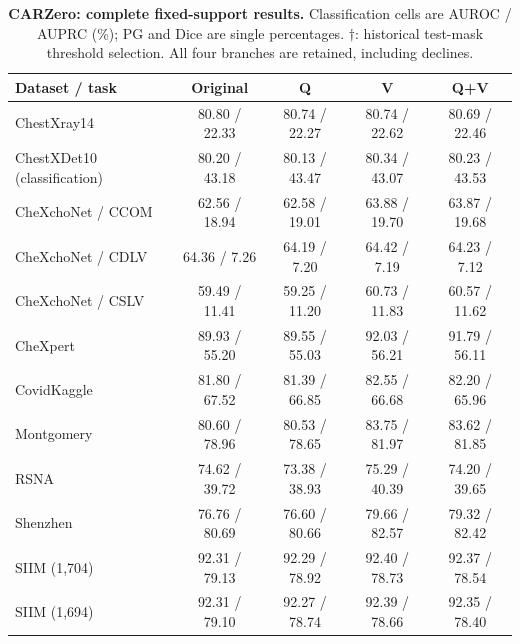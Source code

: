 \begin{table}[tp]
\centering
\caption{\textbf{CARZero: complete fixed-support results.} Classification cells are AUROC / AUPRC (\%); PG and Dice are single percentages. $\dagger$: historical test-mask threshold selection. All four branches are retained, including declines.}
\label{tab:supp-fixed-carzero}
\small
\setlength{\tabcolsep}{4pt}
\begin{tabular*}{\textwidth}{@{\extracolsep{\fill}}lcccc@{}}
\toprule
Dataset / task & Original & Q & V & Q+V \\
\midrule
ChestXray14 & 80.80 / 22.33 & 80.74 / 22.27 & 80.74 / 22.62 & 80.69 / 22.46 \\
ChestXDet10 (classification) & 80.20 / 43.18 & 80.13 / 43.47 & 80.34 / 43.07 & 80.23 / 43.53 \\
CheXchoNet / CCOM & 62.56 / 18.94 & 62.58 / 19.01 & 63.88 / 19.70 & 63.87 / 19.68 \\
CheXchoNet / CDLV & 64.36 / 7.26 & 64.19 / 7.20 & 64.42 / 7.19 & 64.23 / 7.12 \\
CheXchoNet / CSLV & 59.49 / 11.41 & 59.25 / 11.20 & 60.73 / 11.83 & 60.57 / 11.62 \\
CheXpert & 89.93 / 55.20 & 89.55 / 55.03 & 92.03 / 56.21 & 91.79 / 56.11 \\
CovidKaggle & 81.80 / 67.52 & 81.39 / 66.85 & 82.55 / 66.68 & 82.20 / 65.96 \\
Montgomery & 80.60 / 78.96 & 80.53 / 78.65 & 83.75 / 81.97 & 83.62 / 81.85 \\
RSNA & 74.62 / 39.72 & 73.38 / 38.93 & 75.29 / 40.39 & 74.20 / 39.65 \\
Shenzhen & 76.76 / 80.69 & 76.60 / 80.66 & 79.66 / 82.57 & 79.32 / 82.42 \\
SIIM (1,704) & 92.31 / 79.13 & 92.29 / 78.92 & 92.40 / 78.73 & 92.37 / 78.54 \\
SIIM (1,694) & 92.31 / 79.10 & 92.27 / 78.74 & 92.39 / 78.66 & 92.35 / 78.40 \\
\bottomrule
\end{tabular*}
\end{table}

